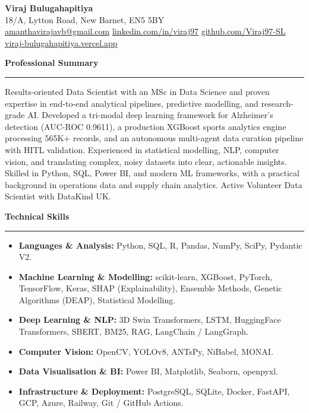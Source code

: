 \documentclass[a4paper,10pt]{article}
\newcommand{\sect}[1]{\vspace{8pt}\noindent\textbf{\color{heading}\large #1}\vspace{3pt}\hrule\vspace{6pt}}
\begin{document}
\begin{center}
  {\LARGE \textbf{Viraj Bulugahapitiya}} \\
  18/A, Lytton Road, New Barnet, EN5 5BY \\
  \vspace{3pt}
  \href{mailto:amanthavirajavb@gmail.com}{\faEnvelope\;amanthavirajavb@gmail.com} \quad
  \href{https://linkedin.com/in/viraj97}{\faLinkedin\;linkedin.com/in/viraj97} \quad
  \href{https://github.com/Viraj97-SL}{\faGithub\;github.com/Viraj97-SL} \quad
  \href{https://viraj-bulugahapitiya.vercel.app}{\faGlobe\;viraj-bulugahapitiya.vercel.app}
\end{center}

\sect{Professional Summary}
Results-oriented Data Scientist with an MSc in Data Science and proven expertise in end-to-end analytical pipelines, predictive modelling, and research-grade AI. Developed a tri-modal deep learning framework for Alzheimer's detection (AUC-ROC 0.9611), a production XGBoost sports analytics engine processing 565K+ records, and an autonomous multi-agent data curation pipeline with HITL validation. Experienced in statistical modelling, NLP, computer vision, and translating complex, noisy datasets into clear, actionable insights. Skilled in Python, SQL, Power BI, and modern ML frameworks, with a practical background in operations data and supply chain analytics. Active Volunteer Data Scientist with DataKind UK.

\sect{Technical Skills}
\begin{itemize}[leftmargin=*, itemsep=2pt, topsep=2pt]
    \item \textbf{Languages \& Analysis:} Python, SQL, R, Pandas, NumPy, SciPy, Pydantic V2.
    \item \textbf{Machine Learning \& Modelling:} scikit-learn, XGBoost, PyTorch, TensorFlow, Keras, SHAP (Explainability), Ensemble Methods, Genetic Algorithms (DEAP), Statistical Modelling.
    \item \textbf{Deep Learning \& NLP:} 3D Swin Transformers, LSTM, HuggingFace Transformers, SBERT, BM25, RAG, LangChain / LangGraph.
    \item \textbf{Computer Vision:} OpenCV, YOLOv8, ANTsPy, NiBabel, MONAI.
    \item \textbf{Data Visualisation \& BI:} Power BI, Matplotlib, Seaborn, openpyxl.
    \item \textbf{Infrastructure \& Deployment:} PostgreSQL, SQLite, Docker, FastAPI, GCP, Azure, Railway, Git / GitHub Actions.
\end{itemize}
\end{document}

